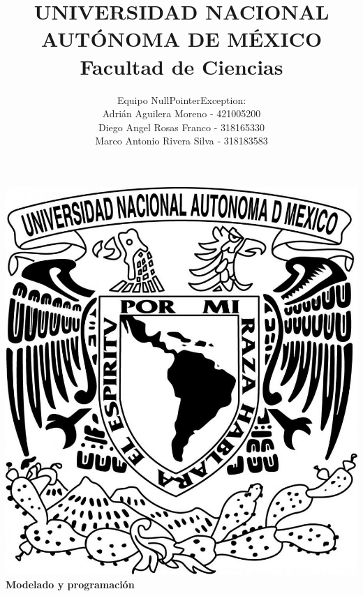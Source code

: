 \title{UNIVERSIDAD NACIONAL AUT\'ONOMA DE M\'EXICO\\ Facultad de Ciencias}
\author{Equipo NullPointerException:\\
        Adri\'an Aguilera Moreno   - 421005200\\
        Diego Angel Rosas Franco   - 318165330 \\
        Marco Antonio Rivera Silva - 318183583}
\date{}
\maketitle
\begin{center}
  \includegraphics[scale=0.20]{./Portada/Portada}\\[0.4cm]
  \Large
  \bf{Modelado y programación}
  \normalsize
\end{center}
\newpage
{}

